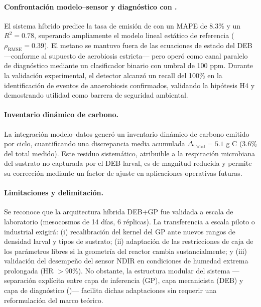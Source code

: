 \paragraph{Confrontación modelo--sensor y diagnóstico con .}
El sistema híbrido predice la tasa de emisión de  con un MAPE de \num{8.3}\% y un $R^{2} = \num{0.78}$, superando ampliamente el modelo lineal estático de referencia ($\rho_{\mathrm{RMSE}} = \num{0.39}$). El metano se mantuvo fuera de las ecuaciones de estado del DEB —conforme al supuesto de aerobiosis estricta— pero operó como canal paralelo de diagnóstico mediante un clasificador binario con umbral de \num{100} ppm. Durante la validación experimental, el detector alcanzó un recall del \num{100}\% en la identificación de eventos de anaerobiosis confirmados, validando la hipótesis H4 y demostrando utilidad como barrera de seguridad ambiental.

\paragraph{Inventario dinámico de carbono.}
La integración modelo--datos generó un inventario dinámico de carbono emitido por ciclo, cuantificando una discrepancia media acumulada $\bar{\Delta}_{\mathrm{Total}} = \num{+5.1}$ g C (\num{3.6}\% del total medido). Este residuo sistemático, atribuible a la respiración microbiana del sustrato no capturada por el DEB larval, es de magnitud reducida y permite su corrección mediante un factor de ajuste en aplicaciones operativas futuras.

\paragraph{Limitaciones y delimitación.}
Se reconoce que la arquitectura híbrida DEB+GP fue validada a escala de laboratorio (mesocosmos de \num{14} días, \num{6} réplicas). La transferencia a escala piloto o industrial exigirá: (i) recalibración del kernel del GP ante nuevos rangos de densidad larval y tipos de sustrato; (ii) adaptación de las restricciones de caja de los parámetros libres si la geometría del reactor cambia sustancialmente; y (iii) validación del desempeño del sensor NDIR en condiciones de humedad extrema prolongada (HR $> \num{90}$\%). No obstante, la estructura modular del sistema —separación explícita entre capa de inferencia (GP), capa mecanicista (DEB) y capa de diagnóstico ()— facilita dichas adaptaciones sin requerir una reformulación del marco teórico.

